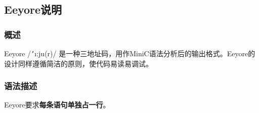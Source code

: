 \subsection{Eeyore说明}
\subsubsection{概述}
Eeyore /\texttt{'}\i:ju\textschwa(r)/ 是一种三地址码，用作MiniC语法分析后的输出格式。Eeyore的设计同样遵循简洁的原则，使代码易读易调试。



\subsubsection{语法描述}
Eeyore要求\textbf{每条语句单独占一行}。

